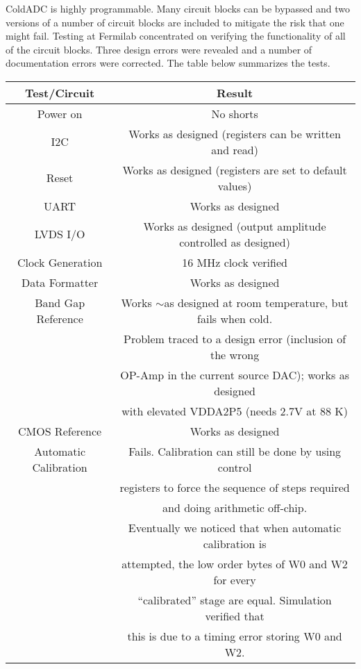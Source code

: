 \label{sec:3}

ColdADC is highly programmable.  Many circuit blocks can be bypassed and two versions of a number of circuit blocks are included to mitigate the risk that one might fail.  Testing at Fermilab concentrated on verifying the functionality of all of the circuit blocks.  Three design errors were revealed and a number of documentation errors were corrected.  The table below summarizes the tests.
 
 \begin{table}[h]
\centering
\begin{tabular}{|c|c|}
\hline
\textbf{ Test/Circuit} & Result  \\ \hline \hline
Power on &  No shorts \\ \hline
I2C & Works as designed (registers can be written and read) \\ \hline
Reset & Works as designed (registers are set to default values) \\ \hline
UART & Works as designed \\ \hline
LVDS I/O & Works as designed (output amplitude controlled as designed) \\ \hline
Clock Generation & 16 MHz clock verified \\ \hline
Data Formatter & Works as designed \\ \hline
Band Gap Reference & Works $\sim$as designed at room temperature, but fails when cold. \\ 
 & Problem traced to a design error (inclusion of the wrong \\ 
 &  OP-Amp in the current source DAC); works as designed \\ 
 &  with elevated VDDA2P5 (needs 2.7V at 88 K) \\ \hline
 CMOS Reference & Works as designed \\ \hline
 Automatic Calibration & Fails.  Calibration can still be done by using control \\ 
  & registers to force the sequence of steps required \\ 
   & and doing arithmetic off-chip.\\ 
    & Eventually we noticed that when automatic calibration is \\ 
     & attempted, the low order bytes of W0 and W2 for every \\ 
      & ``calibrated'' stage are equal. Simulation verified that  \\ 
       & this is due to a timing error storing W0 and W2. \\ \hline

\end{tabular}
\end{table}
